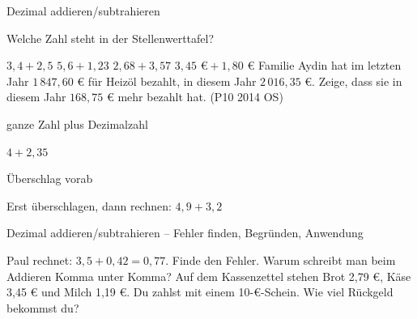 \setcounter{aufgabe}{13}

\begin{aufgabe}{Dezimal addieren/subtrahieren}
\begin{teile}
\teil Welche Zahl steht in der Stellenwerttafel?

\leerfeld
\teil $3{,}4 + 2{,}5$
\teil $5{,}6 + 1{,}23$
\teil $2{,}68 + 3{,}57$
\teil $3{,}45\text{ €} + 1{,}80\text{ €}$
\teil Familie Aydin hat im letzten Jahr $1\,847{,}60$ € für Heizöl bezahlt, in diesem Jahr $2\,016{,}35$ €. Zeige, dass sie in diesem Jahr $168{,}75$ € mehr bezahlt hat. \hfill (P10 2014 OS)
\end{teile}
\end{aufgabe}

\begin{aufgabe}{ganze Zahl plus Dezimalzahl}
\begin{teile}
\teil $4 + 2{,}35$
\end{teile}
\end{aufgabe}

\begin{aufgabe}{Überschlag vorab}
\begin{teile}
\teil Erst überschlagen, dann rechnen: $4{,}9 + 3{,}2$
\end{teile}
\end{aufgabe}

\begin{aufgabe}{Dezimal addieren/subtrahieren – Fehler finden, Begründen, Anwendung}
\begin{teile}
\teil Paul rechnet: $3{,}5 + 0{,}42 = 0{,}77$. Finde den Fehler.
\teil Warum schreibt man beim Addieren Komma unter Komma?
\teil Auf dem Kassenzettel stehen Brot 2,79 €, Käse 3,45 € und Milch 1,19 €. Du zahlst mit einem 10-€-Schein. Wie viel Rückgeld bekommst du?
\end{teile}
\end{aufgabe}

